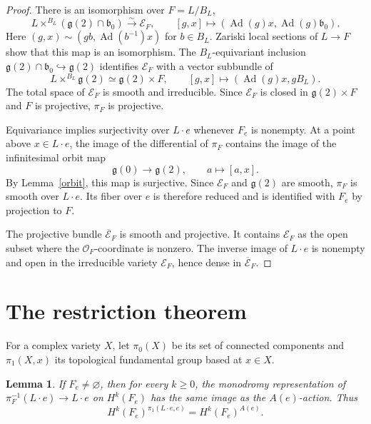 \documentclass[12pt]{article}
\theoremstyle{paperplain}
\newtheorem{lemma}[theorem]{Lemma}
\DeclareMathOperator{\Ad}{Ad}
\newcommand{\g}{\mathfrak g}
\begin{document}
\begin{proof}
    There is an isomorphism over $F=L/B_L$,
    \[
        L\times^{B_L}(\g(2)\cap\mathfrak b_0)
            \xrightarrow{\sim}\mathcal E_F,
        \qquad
        [g,x]\longmapsto(\Ad(g)x,\Ad(g)\mathfrak b_0).
    \]
    Here $(g,x)\sim(gb,\Ad(b^{-1})x)$ for $b\in B_L$. Zariski local sections of $L\to F$ show that this map is an isomorphism. The $B_L$-equivariant inclusion $\g(2)\cap\mathfrak b_0\hookrightarrow\g(2)$ identifies $\mathcal E_F$ with a vector subbundle of
    \[
        L\times^{B_L}\g(2)\simeq\g(2)\times F,
        \qquad [g,x]\longmapsto(\Ad(g)x,gB_L).
    \]
    The total space of $\mathcal E_F$ is smooth and irreducible. Since $\mathcal E_F$ is closed in $\g(2)\times F$ and $F$ is projective, $\pi_F$ is projective.

    Equivariance implies surjectivity over $L\cdot e$ whenever $F_e$ is nonempty. At a point above $x\in L\cdot e$, the image of the differential of $\pi_F$ contains the image of the infinitesimal orbit map
    \[
        \g(0)\longrightarrow\g(2),\qquad a\longmapsto[a,x].
    \]
    By Lemma~\ref{orbit}, this map is surjective. Since $\mathcal E_F$ and $\g(2)$ are smooth, $\pi_F$ is smooth over $L\cdot e$. Its fiber over $e$ is therefore reduced and is identified with $F_e$ by projection to $F$.

    The projective bundle $\overline{\mathcal E}_F$ is smooth and projective. It contains $\mathcal E_F$ as the open subset where the $\mathcal O_F$-coordinate is nonzero. The inverse image of $L\cdot e$ is nonempty and open in the irreducible variety $\mathcal E_F$, hence dense in $\overline{\mathcal E}_F$.
\end{proof}

\vspace{2em}
\section{The restriction theorem}
\label{section-monodromy}

For a complex variety $X$, let $\pi_0(X)$ be its set of connected components and $\pi_1(X,x)$ its topological fundamental group based at $x\in X$.

\begin{lemma}\label{monodromy}
    If $F_e\ne\varnothing$, then for every $k\ge0$, the monodromy representation of $\pi_F^{-1}(L\cdot e)\to L\cdot e$ on $H^k(F_e)$ has the same image as the $A(e)$-action. Thus
    \[
        H^k(F_e)^{\pi_1(L\cdot e,e)}=H^k(F_e)^{A(e)}.
    \]
\end{lemma}
\end{document}

